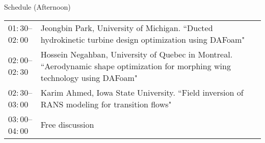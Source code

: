 \documentclass{bredelebeamer}
\begin{document}
\begin{frame}{Schedule (Afternoon)}
\small
\begin{tabularx}{\textwidth}{lX}
 01$:$30--02$:$00 & Jeongbin Park, University of Michigan. ``Ducted hydrokinetic turbine design optimization using DAFoam" \\ 
 02$:$00--02$:$30 & Hossein Negahban, University of Quebec in Montreal. ``Aerodynamic shape optimization for morphing wing technology using DAFoam" \\ 
 02$:$30--03$:$00 & Karim Ahmed, Iowa State University. ``Field inversion of RANS modeling for transition flows" \\ 
 03$:$00--04$:$00 & Free discussion \\ 
\end{tabularx}

\end{frame}
\end{document}
